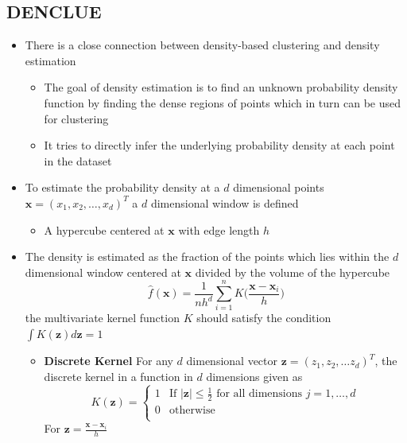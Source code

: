 \documentclass[a4, english]{article}
\begin{document}
\subsection{DENCLUE}
\begin{itemize}
  \item There is a close connection between density-based clustering and density estimation
  \begin{itemize}
	  \item The goal of density estimation is to find an unknown probability density function by finding the dense regions of points which in turn can be used for clustering
  	\item It tries to directly infer the underlying probability density at each point in the dataset 
  \end{itemize}
  \item To estimate the probability density at a $d$ dimensional points $\pmb x = (x_1, x_2, \dots, x_d)^T$ a $d$ dimensional window is defined
  \begin{itemize}
  	\item A hypercube centered at $\pmb x$ with edge length $h$ 
  \end{itemize}
  \item The density is estimated as the fraction of the points which lies within the $d$ dimensional window centered at $\pmb x$ divided by the volume of the hypercube
  \begin{equation*}
    \hat f(\pmb x) = \frac{1}{nh^d} \sum_{i=1}^nK\bigg(\frac{\pmb x- \pmb x_i}{h}\bigg) 
  \end{equation*}
  the multivariate kernel function $K$ should satisfy the condition $\int K(\pmb z) d \pmb z = 1$
  \begin{itemize}
  	\item \textbf{Discrete Kernel} For any $d$ dimensional vector $\pmb z = (z_1, z_2, \dots z_d)^T$, the discrete kernel in a function in $d$ dimensions given as 
    \begin{equation*}
        K(\pmb z) =
          \begin{cases}
            \mbox{$1$} & \mbox{If $|\pmb z| \leq \frac12$} \text{ for all dimensions } j=1,\dots,d\\
            \mbox{$0$} & \mbox{otherwise} \\
          \end{cases}
    \end{equation*}
  For $\pmb z = \frac{\pmb x - \pmb x_i}h$
  \begin{itemize}

\end{itemize}
\end{itemize}
\end{itemize}
\end{document}
